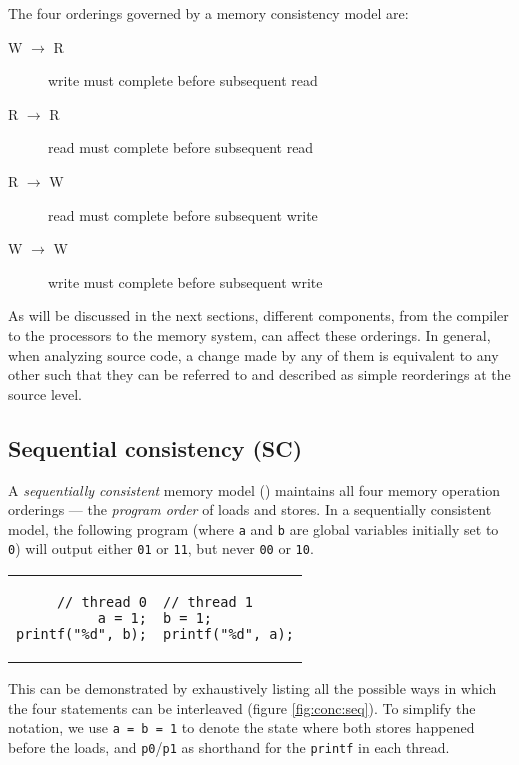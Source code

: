The four orderings governed by a memory consistency model are:

\begin{description}
    \item[W $\to$ R] write must complete before subsequent read
    \item[R $\to$ R] read must complete before subsequent read
    \item[R $\to$ W] read must complete before subsequent write
    \item[W $\to$ W] write must complete before subsequent write
\end{description}

As will be discussed in the next sections, different components, from the
compiler to the processors to the memory system, can affect these orderings.  In
general, when analyzing source code, a change made by any of them is equivalent
to any other such that they can be referred to and described as simple
reorderings at the source level.

\subsection{Sequential consistency (SC)}

A \textit{sequentially consistent} memory model (\cite{Lamport1979}) maintains
all four memory operation orderings --- the \textit{program order} of loads and
stores.  In a sequentially consistent model, the following program (where
\texttt{a} and \texttt{b} are global variables initially set to \texttt{0}) will
output either \texttt{01} or \texttt{11}, but never \texttt{00} or \texttt{10}.

\begin{center}
    \begin{tabular}{rl}
        \begin{lstlisting}[style=c]
// thread 0
a = 1;
printf("%d", b);
        \end{lstlisting}
        &
        \begin{lstlisting}[style=c]
// thread 1
b = 1;
printf("%d", a);
        \end{lstlisting} \\[1.5em]
    \end{tabular}
\end{center}

This can be demonstrated by exhaustively listing all the possible ways in which
the four statements can be interleaved (figure \ref{fig:conc:seq}).  To simplify
the notation, we use \texttt{a = b = 1} to denote the state where both stores
happened before the loads, and \texttt{p0}/\texttt{p1} as shorthand for the
\texttt{printf} in each thread.

